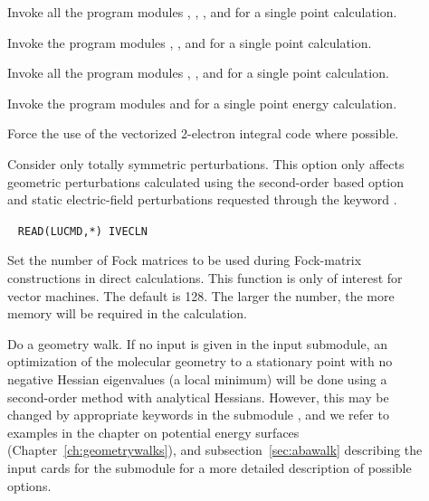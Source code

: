 \begin{description}
\item[]

Invoke all the program modules {\her}, {\sir}, {\resp}, and {\aba} for a single point
     calculation.

\item[]

Invoke the program modules {\her}, {\sir}, and {\aba} for a single point
calculation.

\item[]

Invoke all the program modules {\her}, {\sir}, and {\resp} for a single point
calculation.

\item[]

Invoke the program modules {\her} and {\sir} for a single point energy calculation.


\item[] Force the use of the vectorized 2-electron integral code {\eri} where possible.



\item[] Consider only totally symmetric
perturbations.
This option only affects geometric perturbations calculated using the
second-order based  option and static
electric-field perturbations requested through the keyword .

\item[]\verb| |
\newline
\verb|READ(LUCMD,*) IVECLN|

Set the number of Fock matrices to be used during Fock-matrix constructions in
direct calculations. This function is only of interest for vector machines.
The default is 128. The larger the number, the more memory will be required
in the calculation.

\item[]
Do a geometry walk.
If no input is given in the
 input submodule, an optimization of the molecular
geometry to a stationary point with no negative Hessian eigenvalues (a
local minimum) will be done using a second-order method with
analytical Hessians. However, this may be changed by appropriate
keywords in the submodule , and we refer to examples in
the chapter on potential energy surfaces
(Chapter~\ref{ch:geometrywalks}), and subsection~\ref{sec:abawalk}
describing the input cards for the  submodule for a more
detailed description of possible options.


\end{description}
